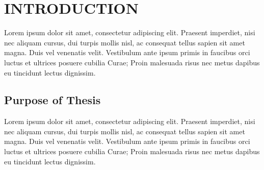 \chapter{INTRODUCTION}\label{introduction}
Lorem ipsum dolor sit amet, consectetur adipiscing elit. Praesent imperdiet, nisi 
nec aliquam cursus, dui turpis mollis nisl, ac consequat tellus sapien sit amet 
magna. Duis vel venenatis velit. Vestibulum ante ipsum primis in faucibus orci 
luctus et ultrices posuere cubilia Curae; Proin malesuada risus nec metus dapibus 
eu tincidunt lectus dignissim. 

\section{Purpose of Thesis}\label{purposeofthesis}

Lorem ipsum dolor sit amet, consectetur adipiscing elit. Praesent imperdiet, nisi 
nec aliquam cursus, dui turpis mollis nisl, ac consequat tellus sapien sit amet 
magna. Duis vel venenatis velit. Vestibulum ante ipsum primis in faucibus orci 
luctus et ultrices posuere cubilia Curae; Proin malesuada risus nec metus dapibus 
eu tincidunt lectus dignissim. 

